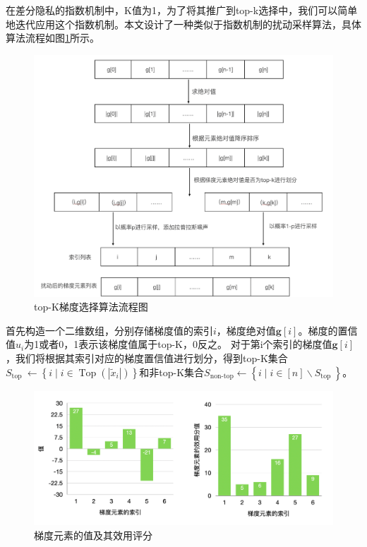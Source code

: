 在差分隐私的指数机制中，K值为1，为了将其推广到top-k选择中，我们可以简单地迭代应用这个指数机制。本文设计了一种类似于指数机制的扰动采样算法，具体算法流程如图\ref{fig:top-K梯度选择算法流程图}所示。

\begin{figure}[!hbt]
\centering
	\includegraphics[scale=0.22]{fig2/C4/top-K流程图}%
	\caption{top-K梯度选择算法流程图}
	\label{fig:top-K梯度选择算法流程图}	
\end{figure}

首先构造一个二维数组，分别存储梯度值的索引$i$，梯度绝对值$\mathbf{g}[i]$。梯度的置信值$u_{i}$为1或者0，1表示该梯度值属于top-K，0反之。
对于第i个索引的梯度值$\mathbf{g}[i]$，我们将根据其索引对应的梯度置信值进行划分，得到top-K集合$S_{\text {top }} \leftarrow\left\{i \mid i \in \operatorname{Top}\left(\left|\tilde{x}_{i}\right|\right)\right\}$和非top-K集合$S_{\text {non-top}} \leftarrow\left\{i \mid i \in[n] \backslash S_{\text {top }}\right\}$。

\begin{figure}[!hbt]
\centering
	\includegraphics[scale=0.45]{fig2/C4/梯度值打分}%
	\caption{梯度元素的值及其效用评分}
	\label{fig:梯度元素的值及其效用评分}	
\end{figure}

